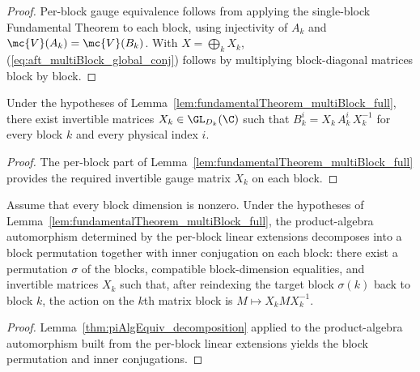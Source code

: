\begin{proof}\leanok{}
    Per-block gauge equivalence follows from applying the single-block
    Fundamental Theorem to each block, using injectivity of
    $A_k$ and $\mc{V}(A_k) = \mc{V}(B_k)$.
    With $X=\bigoplus_k X_k$, (\ref{eq:aft_multiBlock_global_conj})
    follows by multiplying block-diagonal matrices block by block.
\end{proof}

\begin{lemma}%
    \label{lem:fundamentalTheorem_multiBlock_explicit}
    \leanok
    Under the hypotheses of
    Lemma~\ref{lem:fundamentalTheorem_multiBlock_full}, there exist
    invertible matrices $X_k \in \GL_{D_k}(\C)$ such that
    $B_k^i = X_k\, A_k^i\, X_k^{-1}$ for every block $k$ and every
    physical index $i$.
\end{lemma}

\begin{proof}
    \leanok
    The per-block part of Lemma~\ref{lem:fundamentalTheorem_multiBlock_full}
    provides the required invertible gauge matrix $X_k$ on each block.
\end{proof}

\begin{lemma}%
    \label{lem:fundamentalTheorem_multiBlock_decomposition}
    \leanok
    Assume that every block dimension is nonzero.
    Under the hypotheses of
    Lemma~\ref{lem:fundamentalTheorem_multiBlock_full}, the product-algebra
    automorphism determined by the per-block linear extensions decomposes into
    a block permutation together with inner conjugation on each block: there
    exist a permutation $\sigma$ of the blocks, compatible block-dimension
    equalities, and invertible matrices $X_k$ such that, after reindexing the
    target block $\sigma(k)$ back to block $k$, the action on the $k$th matrix
    block is $M \mapsto X_k M X_k^{-1}$.
\end{lemma}

\begin{proof}
    \leanok
    Lemma~\ref{thm:piAlgEquiv_decomposition} applied to the product-algebra
    automorphism built from the per-block linear extensions yields the block
    permutation and inner conjugations.
\end{proof}


